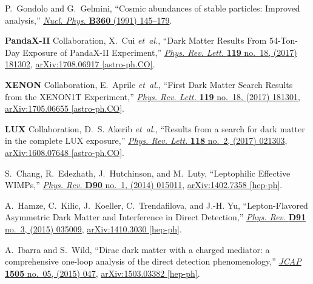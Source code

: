 \documentclass[aps,prd,letterpaper,showpacs,twocolumn,preprintnumbers,floatfix,superscriptaddress]{revtex4-1}
\begin{document}
\begin{thebibliography}{99}
P.~Gondolo and G.~Gelmini, ``{Cosmic abundances of stable particles: Improved
  analysis},''
\href{http://dx.doi.org/10.1016/0550-3213(91)90438-4}{{\em Nucl. Phys.}
  {\bfseries B360} (1991) 145--179}.

{\bfseries PandaX-II} Collaboration, X.~Cui {\em et~al.}, ``{Dark Matter
  Results From 54-Ton-Day Exposure of PandaX-II Experiment},''
  \href{http://dx.doi.org/10.1103/PhysRevLett.119.181302}{{\em Phys. Rev.
  Lett.} {\bfseries 119} no.~18, (2017) 181302},
\href{http://arxiv.org/abs/1708.06917}{{\ttfamily arXiv:1708.06917
  [astro-ph.CO]}}.

{\bfseries XENON} Collaboration, E.~Aprile {\em et~al.}, ``{First Dark Matter
  Search Results from the XENON1T Experiment},''
  \href{http://dx.doi.org/10.1103/PhysRevLett.119.181301}{{\em Phys. Rev.
  Lett.} {\bfseries 119} no.~18, (2017) 181301},
\href{http://arxiv.org/abs/1705.06655}{{\ttfamily arXiv:1705.06655
  [astro-ph.CO]}}.

{\bfseries LUX} Collaboration, D.~S. Akerib {\em et~al.}, ``{Results from a
  search for dark matter in the complete LUX exposure},''
  \href{http://dx.doi.org/10.1103/PhysRevLett.118.021303}{{\em Phys. Rev.
  Lett.} {\bfseries 118} no.~2, (2017) 021303},
\href{http://arxiv.org/abs/1608.07648}{{\ttfamily arXiv:1608.07648
  [astro-ph.CO]}}.

S.~Chang, R.~Edezhath, J.~Hutchinson, and M.~Luty, ``{Leptophilic Effective
  WIMPs},'' \href{http://dx.doi.org/10.1103/PhysRevD.90.015011}{{\em Phys.
  Rev.} {\bfseries D90} no.~1, (2014) 015011},
\href{http://arxiv.org/abs/1402.7358}{{\ttfamily arXiv:1402.7358 [hep-ph]}}.

A.~Hamze, C.~Kilic, J.~Koeller, C.~Trendafilova, and J.-H. Yu,
  ``{Lepton-Flavored Asymmetric Dark Matter and Interference in Direct
  Detection},'' \href{http://dx.doi.org/10.1103/PhysRevD.91.035009}{{\em Phys.
  Rev.} {\bfseries D91} no.~3, (2015) 035009},
\href{http://arxiv.org/abs/1410.3030}{{\ttfamily arXiv:1410.3030 [hep-ph]}}.

A.~Ibarra and S.~Wild, ``{Dirac dark matter with a charged mediator: a
  comprehensive one-loop analysis of the direct detection phenomenology},''
  \href{http://dx.doi.org/10.1088/1475-7516/2015/05/047}{{\em JCAP} {\bfseries
  1505} no.~05, (2015) 047},
\href{http://arxiv.org/abs/1503.03382}{{\ttfamily arXiv:1503.03382 [hep-ph]}}.


\end{thebibliography}
\end{document}
